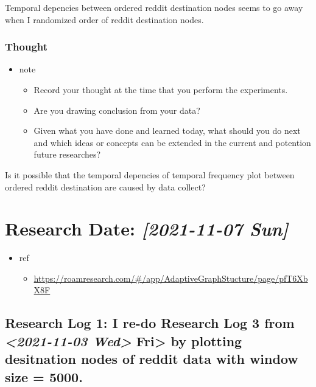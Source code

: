\documentclass[11pt]{article}
\begin{document}
Temporal depencies between ordered reddit destination nodes seems to go away when I randomized order of reddit destination nodes.

\subsubsection{Thought}
\label{sec:org8da2222}
\begin{itemize}
\item note
\begin{itemize}
\item Record your thought at the time that you perform the experiments.
\item Are you drawing conclusion from your data?
\item Given what you have done and learned today, what should you do next and which ideas or concepts can be extended in the current and potention future researches?
\end{itemize}
\end{itemize}
Is it possible that the temporal depencies of temporal frequency plot between ordered reddit destination are caused by data collect?

\section{Research Date: \textit{[2021-11-07 Sun]}}
\label{sec:orgae4ad7b}
\begin{itemize}
\item ref
\begin{itemize}
\item \url{https://roamresearch.com/\#/app/AdaptiveGraphStucture/page/pfT6XbX8F}
\end{itemize}
\end{itemize}
\subsection{Research Log 1: I re-do Research Log 3 from \textit{<2021-11-03 Wed> } Fri> by plotting desitnation nodes of reddit data with window size = 5000.}
\label{sec:orgcf9e621}
\end{document}
